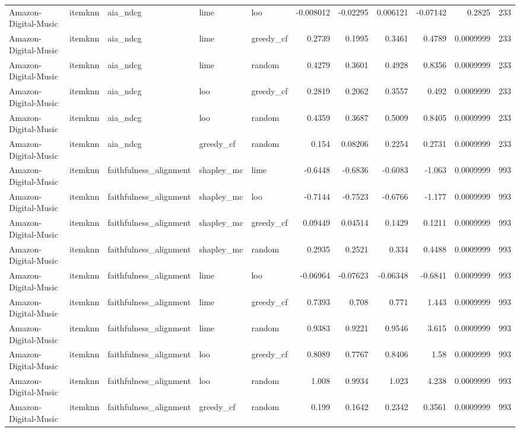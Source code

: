 \begin{table}[t]
\begin{tabular}{lllllrrrrrr}
Amazon-Digital-Music & itemknn & aia\_ndcg & lime & loo & -0.008012 & -0.02295 & 0.006121 & -0.07142 & 0.2825 & 233 \\
Amazon-Digital-Music & itemknn & aia\_ndcg & lime & greedy\_cf & 0.2739 & 0.1995 & 0.3461 & 0.4789 & 0.0009999 & 233 \\
Amazon-Digital-Music & itemknn & aia\_ndcg & lime & random & 0.4279 & 0.3601 & 0.4928 & 0.8356 & 0.0009999 & 233 \\
Amazon-Digital-Music & itemknn & aia\_ndcg & loo & greedy\_cf & 0.2819 & 0.2062 & 0.3557 & 0.492 & 0.0009999 & 233 \\
Amazon-Digital-Music & itemknn & aia\_ndcg & loo & random & 0.4359 & 0.3687 & 0.5009 & 0.8405 & 0.0009999 & 233 \\
Amazon-Digital-Music & itemknn & aia\_ndcg & greedy\_cf & random & 0.154 & 0.08206 & 0.2254 & 0.2731 & 0.0009999 & 233 \\
Amazon-Digital-Music & itemknn & faithfulness\_alignment & shapley\_mc & lime & -0.6448 & -0.6836 & -0.6083 & -1.063 & 0.0009999 & 993 \\
Amazon-Digital-Music & itemknn & faithfulness\_alignment & shapley\_mc & loo & -0.7144 & -0.7523 & -0.6766 & -1.177 & 0.0009999 & 993 \\
Amazon-Digital-Music & itemknn & faithfulness\_alignment & shapley\_mc & greedy\_cf & 0.09449 & 0.04514 & 0.1429 & 0.1211 & 0.0009999 & 993 \\
Amazon-Digital-Music & itemknn & faithfulness\_alignment & shapley\_mc & random & 0.2935 & 0.2521 & 0.334 & 0.4488 & 0.0009999 & 993 \\
Amazon-Digital-Music & itemknn & faithfulness\_alignment & lime & loo & -0.06964 & -0.07623 & -0.06348 & -0.6841 & 0.0009999 & 993 \\
Amazon-Digital-Music & itemknn & faithfulness\_alignment & lime & greedy\_cf & 0.7393 & 0.708 & 0.771 & 1.443 & 0.0009999 & 993 \\
Amazon-Digital-Music & itemknn & faithfulness\_alignment & lime & random & 0.9383 & 0.9221 & 0.9546 & 3.615 & 0.0009999 & 993 \\
Amazon-Digital-Music & itemknn & faithfulness\_alignment & loo & greedy\_cf & 0.8089 & 0.7767 & 0.8406 & 1.58 & 0.0009999 & 993 \\
Amazon-Digital-Music & itemknn & faithfulness\_alignment & loo & random & 1.008 & 0.9934 & 1.023 & 4.238 & 0.0009999 & 993 \\
Amazon-Digital-Music & itemknn & faithfulness\_alignment & greedy\_cf & random & 0.199 & 0.1642 & 0.2342 & 0.3561 & 0.0009999 & 993 \\

\end{tabular}
\end{table}
